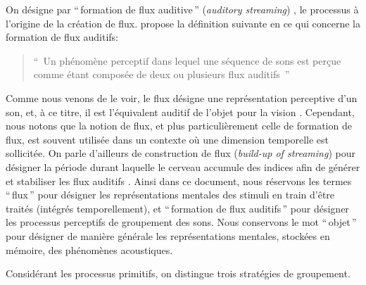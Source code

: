 On désigne par ``\,formation de flux auditive\,'' (\emph{auditory streaming}) , le processus à l'origine de la création de flux. \citep{winkler2009modeling} propose la définition suivante en ce qui concerne la formation de flux auditifs:

\begin{quote}
``\, Un phénomène perceptif dans lequel une séquence de sons est perçue comme étant composée de deux ou plusieurs flux auditifs \,''
\end{quote}

Comme nous venons de le voir, le flux désigne une représentation perceptive d'un son, et, à ce titre, il est l'équivalent auditif de l'objet pour la vision \citep[p. 11]{bregman1994auditory}. Cependant, nous notons que la notion de flux, et plus particulièrement celle de formation de flux, est souvent utilisée dans un contexte où une dimension temporelle est sollicitée. On parle d'ailleurs de construction de flux  (\emph{build-up of streaming}) pour désigner la période durant laquelle le cerveau accumule des indices afin de générer et stabiliser les flux auditifs  \citep{cusack2004effects,snyder2007toward}. Ainsi dans ce document, nous réservons les termes ``\,flux\,'' pour désigner les représentations mentales des stimuli en train d'être traités (intégrés temporellement), et ``\,formation de flux auditifs\,'' pour désigner les processus perceptifs de groupement des sons. Nous conservons le mot ``\,objet\,'' pour désigner de manière générale les représentations mentales, stockées en mémoire, des phénomènes acoustiques.

Considérant les processus primitifs, on distingue trois stratégies de groupement.

